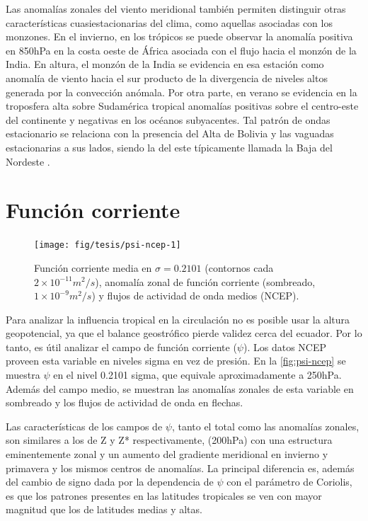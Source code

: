 \documentclass[spanish,a4paper,12pt,oneside]{book}
\begin{document}
Las anomalías zonales del viento meridional también permiten distinguir
otras características cuasiestacionarias del clima, como aquellas
asociadas con los monzones. En el invierno, en los trópicos se puede
observar la anomalía positiva en 850hPa en la costa oeste de África
asociada con el flujo hacia el monzón de la India. En altura, el monzón
de la India se evidencia en esa estación como anomalía de viento hacia
el sur producto de la divergencia de niveles altos generada por la
convección anómala. Por otra parte, en verano se evidencia en la
troposfera alta sobre Sudamérica tropical anomalías positivas sobre el
centro-este del continente y negativas en los océanos subyacentes. Tal
patrón de ondas estacionario se relaciona con la presencia del Alta de
Bolivia y las vaguadas estacionarias a sus lados, siendo la del este
típicamente llamada la Baja del Nordeste \citep{Vera2006}.

\section{Función corriente}\label{funcion-corriente}

\begin{landscape}\begin{figure}

{\centering \texttt{[image: fig/tesis/psi-ncep-1]} 

}

\caption{Función corriente media en $\sigma = 0.2101$ (contornos cada $2\times10^{-11}m^2/s$), anomalía zonal de función corriente (sombreado,  $1\times10^{-9}m^2/s$) y flujos de actividad de onda medios (NCEP).}\label{fig:psi-ncep}
\end{figure}
\end{landscape}

Para analizar la influencia tropical en la circulación no es posible
usar la altura geopotencial, ya que el balance geostrófico pierde
validez cerca del ecuador. Por lo tanto, es útil analizar el campo de
función corriente (\(\psi\)). Los datos NCEP proveen esta variable en
niveles sigma en vez de presión. En la \autoref{fig:psi-ncep} se muestra
\(\psi\) en el nivel 0.2101 sigma, que equivale aproximadamente a
250hPa. Además del campo medio, se muestran las anomalías zonales de
esta variable en sombreado y los flujos de actividad de onda en flechas.

Las características de los campos de \(\psi\), tanto el total como las
anomalías zonales, son similares a los de Z y Z* respectivamente,
(200hPa) con una estructura eminentemente zonal y un aumento del
gradiente meridional en invierno y primavera y los mismos centros de
anomalías. La principal diferencia es, además del cambio de signo dada
por la dependencia de \(\psi\) con el parámetro de Coriolis, es que los
patrones presentes en las latitudes tropicales se ven con mayor magnitud
que los de latitudes medias y altas.
\end{document}

